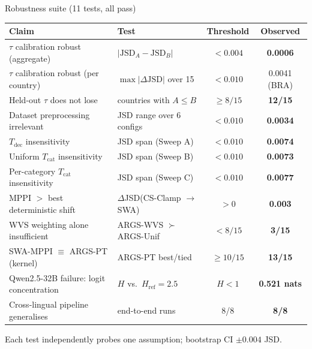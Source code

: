\documentclass[10pt,aspectratio=169]{beamer}
\begin{document}
\begin{frame}{Robustness suite (11 tests, all pass)}
  \centering\scriptsize
  \begin{tabular}{p{4.7cm}p{4.0cm}cc}
    \toprule
    \textbf{Claim} & \textbf{Test} & \textbf{Threshold} & \textbf{Observed} \\
    \midrule
    $\tau$ calibration robust (aggregate) & $|\text{JSD}_A - \text{JSD}_B|$ & $<0.004$ & \textbf{0.0006} \\
    $\tau$ calibration robust (per country) & $\max|\Delta\text{JSD}|$ over 15 & $<0.010$ & 0.0041 (BRA) \\
    Held-out $\tau$ does not lose & countries with $A\le B$ & $\ge 8/15$ & \textbf{12/15} \\
    Dataset preprocessing irrelevant & JSD range over 6 configs & $<0.010$ & \textbf{0.0034} \\
    $T_\text{dec}$ insensitivity & JSD span (Sweep A) & $<0.010$ & \textbf{0.0074} \\
    Uniform $T_\text{cat}$ insensitivity & JSD span (Sweep B) & $<0.010$ & \textbf{0.0073} \\
    Per-category $T_\text{cat}$ insensitivity & JSD span (Sweep C) & $<0.010$ & \textbf{0.0077} \\
    MPPI $>$ best deterministic shift & $\Delta$JSD(CS-Clamp $\to$ SWA) & $>0$ & \textbf{0.003} \\
    WVS weighting alone insufficient & ARGS-WVS $\succ$ ARGS-Unif & $<8/15$ & \textbf{3/15} \\
    SWA-MPPI $\equiv$ ARGS-PT (kernel) & ARGS-PT best/tied & $\ge10/15$ & \textbf{13/15} \\
    Qwen2.5-32B failure: logit concentration & $H$ vs.\ $H_\text{ref}=2.5$ & $H<1$ & \textbf{0.521 nats} \\
    Cross-lingual pipeline generalises & end-to-end runs & 8/8 & \textbf{8/8} \\
    \bottomrule
  \end{tabular}
  \vspace{0.4em}

  \footnotesize Each test independently probes one assumption; bootstrap CI $\pm 0.004$ JSD.
\end{frame}
\end{document}
